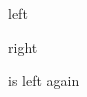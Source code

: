 \documentclass{beamer}
\begin{document}
\begin{frame}
  left
\end{frame} 

\begin{frame}[fullimage]
  right
\end{frame}

\begin{frame}
  is left again
\end{frame}
\end{document}
